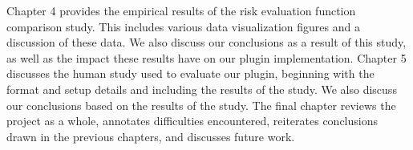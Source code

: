 Chapter 4 provides the empirical results of the risk evaluation function
comparison study.  This includes various data visualization figures and
a discussion of these data.  We also discuss our conclusions as a result
of this study, as well as the impact these results have on our plugin 
implementation.  Chapter 5 discusses the human study used to evaluate our
plugin, beginning with the format and setup details and including the results
of the study.  We also discuss our conclusions based on the results of the study.
The final chapter reviews the project as a whole, annotates difficulties 
encountered, reiterates conclusions drawn in the previous chapters, 
and discusses future work.